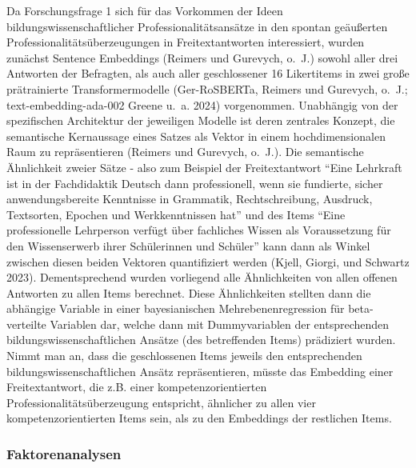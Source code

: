 \documentclass[
  letterpaper,
  DIV=11]{scrartcl}
\begin{document}
Da Forschungsfrage 1 sich für das Vorkommen der Ideen
bildungswissenschaftlicher Professionalitätsansätze in den spontan
geäußerten Professionalitätsüberzeugungen in Freitextantworten
interessiert, wurden zunächst Sentence Embeddings (Reimers und Gurevych,
o.~J.) sowohl aller drei Antworten der Befragten, als auch aller
geschlossener 16 Likertitems in zwei große prätrainierte
Transformermodelle (Ger-RoSBERTa, Reimers und Gurevych, o.~J.;
text-embedding-ada-002 Greene u.~a. 2024) vorgenommen. Unabhängig von
der spezifischen Architektur der jeweiligen Modelle ist deren zentrales
Konzept, die semantische Kernaussage eines Satzes als Vektor in einem
hochdimensionalen Raum zu repräsentieren (Reimers und Gurevych, o.~J.).
Die semantische Ähnlichkeit zweier Sätze - also zum Beispiel der
Freitextantwort ``Eine Lehrkraft ist in der Fachdidaktik Deutsch dann
professionell, wenn sie fundierte, sicher anwendungsbereite Kenntnisse
in Grammatik, Rechtschreibung, Ausdruck, Textsorten, Epochen und
Werkkenntnissen hat'' und des Items ``Eine professionelle Lehrperson
verfügt über fachliches Wissen als Voraussetzung für den Wissenserwerb
ihrer Schülerinnen und Schüler'' kann dann als Winkel zwischen diesen
beiden Vektoren quantifiziert werden (Kjell, Giorgi, und Schwartz 2023).
Dementsprechend wurden vorliegend alle Ähnlichkeiten von allen offenen
Antworten zu allen Items berechnet. Diese Ähnlichkeiten stellten dann
die abhängige Variable in einer bayesianischen Mehrebenenregression für
beta-verteilte Variablen dar, welche dann mit Dummyvariablen der
entsprechenden bildungswissenschaftlichen Ansätze (des betreffenden
Items) prädiziert wurden. Nimmt man an, dass die geschlossenen Items
jeweils den entsprechenden bildungswissenschaftlichen Ansätz
repräsentieren, müsste das Embedding einer Freitextantwort, die z.B.
einer kompetenzorientierten Professionalitätsüberzeugung entspricht,
ähnlicher zu allen vier kompetenzorientierten Items sein, als zu den
Embeddings der restlichen Items.

\subsubsection{Faktorenanalysen}\label{sec-faktorenanalysen}
\end{document}
